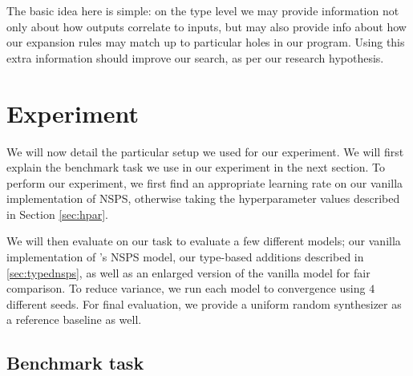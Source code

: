\documentclass{article}
\begin{document}
The basic idea here is simple:
on the type level we may provide information not only about how outputs correlate to inputs,
but may also provide info about how our expansion rules may match up to particular holes in our program.
Using this extra information should improve our search,
as per our research hypothesis. %


\section{Experiment} \label{sec:experiment}

We will now detail the particular setup we used for our experiment.
We will first explain the benchmark task we use in our experiment in
the next section.
To perform our experiment, we
first find an appropriate learning rate on our vanilla implementation of NSPS,
otherwise taking the hyperparameter values described in Section \ref{sec:hpar}.

We will then evaluate on our task to evaluate a few different models;
our vanilla implementation of \citet{nsps}'s NSPS model,
our type-based additions described in \ref{sec:typednsps},
as well as an enlarged version of the vanilla model for fair comparison.
To reduce variance, we run each model to convergence using $4$ different seeds.
For final evaluation, we provide a uniform random synthesizer as a reference baseline as well.

\subsection{Benchmark task} \label{sec:task}
\end{document}
